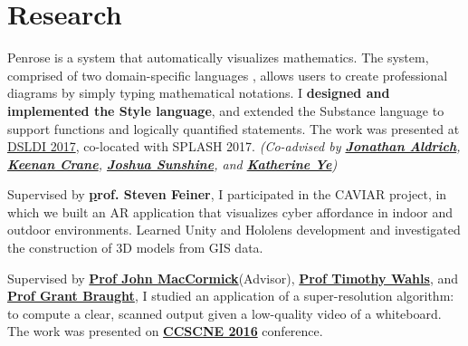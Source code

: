 \documentclass[]{deedy-resume-openfont}
\begin{document}
\begin{minipage}[t]{0.66\textwidth}



\section{Research}
    Penrose is a system that automatically visualizes mathematics.  The system, comprised of two domain-specific languages
    , allows users to create professional diagrams by simply typing mathematical notations. I \textbf{designed and implemented the Style language}, and extended the Substance language to support functions and logically quantified statements. The work was presented at  \href{https://conf.researchr.org/event/dsldi-2017/dsldi-2017-substance-and-style-domain-specific-languages-for-mathematical-diagrams}{DSLDI 2017}, co-located with SPLASH 2017. \textit{(Co-advised by \textbf{\href{https://www.cs.cmu.edu/~./aldrich/}{Jonathan Aldrich}}, \textbf{\href{https://www.cs.cmu.edu/~kmcrane/}{Keenan Crane}}, \textbf{\href{http://www.cs.cmu.edu/~jssunshi/}{Joshua Sunshine}}, and \textbf{\href{https://www.cs.cmu.edu/~kqy/}{Katherine Ye}})}

\sectionsep

Supervised by \textbf{\href{http://www.cs.columbia.edu/~feiner/}prof. Steven Feiner}, I participated in the CAVIAR project, in which we built an AR application that visualizes cyber affordance in indoor and outdoor environments. Learned Unity and Hololens development and investigated the construction of 3D models from GIS data.
\sectionsep

 Supervised by \textbf{\href{http://users.dickinson.edu/~jmac/}{Prof John MacCormick}}(Advisor), \textbf{\href{http://users.dickinson.edu/~wahlst/}{Prof Timothy Wahls}}, and \textbf{\href{http://users.dickinson.edu/~braught/?}{Prof Grant Braught}}, I studied an application of a super-resolution algorithm: to compute a clear, scanned output given a low-quality video of a whiteboard. The work was presented on \textbf{\href{http://ccscne.org/conferences/ccscne-2016/}{CCSCNE 2016}} conference.
\sectionsep



\end{minipage}
\end{document}
